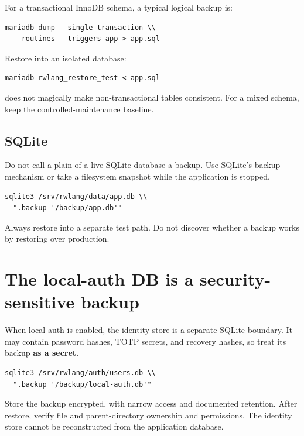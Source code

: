 For a transactional InnoDB schema, a typical logical backup is:

\begin{lstlisting}
mariadb-dump --single-transaction \\
  --routines --triggers app > app.sql
\end{lstlisting}

Restore into an isolated database:

\begin{lstlisting}
mariadb rwlang_restore_test < app.sql
\end{lstlisting}

 does not magically make non-transactional tables consistent. For a mixed schema, keep the controlled-maintenance baseline.

\subsection*{SQLite}

Do not call a plain  of a live SQLite database a backup. Use SQLite's backup mechanism or take a filesystem snapshot while the application is stopped.

\begin{lstlisting}
sqlite3 /srv/rwlang/data/app.db \\
  ".backup '/backup/app.db'"
\end{lstlisting}

Always restore into a separate test path. Do not discover whether a backup works by restoring over production.

\section{The local-auth DB is a security-sensitive backup}

When local auth is enabled, the identity store is a separate SQLite boundary. It may contain password hashes, TOTP secrets, and recovery hashes, so treat its backup \textbf{as a secret}.

\begin{lstlisting}
sqlite3 /srv/rwlang/auth/users.db \\
  ".backup '/backup/local-auth.db'"
\end{lstlisting}

Store the backup encrypted, with narrow access and documented retention. After restore, verify file and parent-directory ownership and permissions. The identity store cannot be reconstructed from the application database.

